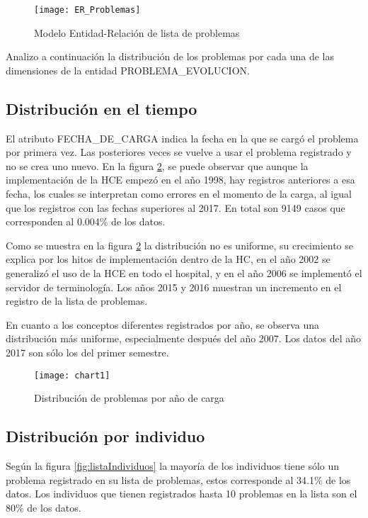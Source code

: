 \begin{figure}[t]
\caption{Modelo Entidad-Relación de lista de problemas}
\label{fig:ModeloER}
\centering
\texttt{[image: ER\_Problemas]}
\end{figure}

Analizo a continuación la distribución de los problemas por cada una de las dimensiones de la entidad PROBLEMA\_EVOLUCION. 
 
\subsection{Distribución en el tiempo}
El atributo FECHA\_DE\_CARGA indica la fecha en la que se cargó el problema por primera vez. Las posteriores veces se vuelve a usar el problema registrado y no se crea uno nuevo. En la figura \ref{fig:registrosYConceptos}, se puede observar que aunque la implementación de la HCE empezó en el año 1998, hay registros anteriores a esa fecha, los cuales se interpretan como errores en el momento de la carga, al igual que los registros con las fechas superiores al 2017. En total son \num{9149} casos que corresponden al \num{0,004}\% de los datos.

Como se muestra en la figura \ref{fig:registrosYConceptos} la distribución no es uniforme, su crecimiento se explica por los hitos de implementación dentro de la HC, en el año \num{2002} se generalizó el uso de la HCE en todo el hospital, y en el año \num{2006} se implementó el servidor de terminología. Los años \num{2015} y \num{2016} muestran un incremento en el registro de la lista de problemas.

En cuanto a los conceptos diferentes registrados por año, se observa una distribución más uniforme, especialmente después del año \num{2007}. Los datos del año 2017 son sólo los del primer semestre.

\begin{figure}[tbp]
\caption{Distribución de problemas por año de carga}
\label{fig:registrosYConceptos}
\centering
\texttt{[image: chart1]}
\end{figure}

\subsection{Distribución por individuo}
Según la figura \ref{fig:listaIndividuos} la mayoría de los individuos tiene sólo un problema registrado en su lista de problemas, estos corresponde al \num{34.1}\% de los datos. Los individuos que tienen registrados hasta 10 problemas en la lista son el \num{80}\% de los datos.

